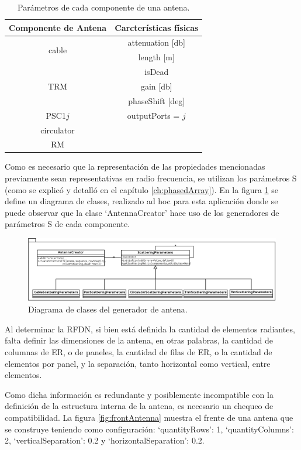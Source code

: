 \begin{table}[H]
  \footnotesize
  \centering
  \begin{tabular}{|c|c|}
	\hline
	\textbf{Componente de Antena} & \textbf{Carcterísticas físicas} \tabularnewline \hline 
	\multirow{2}{*}{cable} &  attenuation [db] \tabularnewline \cline{2-2}
	 & length [m] \tabularnewline \hline 
	\multirow{3}{*}{TRM} & isDead \tabularnewline \cline{2-2}
	 & gain [db]\tabularnewline \cline{2-2}
	 & phaseShift [deg] \tabularnewline \hline 
	PSC1$j$ & outputPorts = $j$ \tabularnewline \hline 
	circulator & \tabularnewline \hline 
	RM & \tabularnewline \hline 
  \end{tabular}
  \caption{Parámetros de cada componente de una antena.}
  \label{tab:propertiesOfComponents}
\end{table}

Como es necesario que la representación de las propiedades mencionadas previamente sean representativas en radio frecuencia,
se utilizan los parámetros S (como se explicó y detalló en el capítulo \ref{ch:phasedArray}). En la figura \ref{fig:creationPackage} 
se define un diagrama de clases, realizado ad hoc para esta aplicación donde se puede observar que la clase \enquote*{AntennaCreator}
hace uso de los generadores de parámetros S de cada componente.

\begin{figure}
 \centering
 \includegraphics[width=15cm]{gfx/creationPackage.png}
 \caption{Diagrama de clases del generador de antena.}
 \label{fig:creationPackage}
\end{figure}

Al determinar la RFDN, si bien está definida la cantidad de elementos radiantes, falta definir las dimensiones de la antena, 
en otras palabras, la cantidad de columnas de ER, o de paneles, la cantidad de filas de ER, o la cantidad de elementos por
panel, y la separación, tanto horizontal como vertical, entre elementos. 

Como dicha información es redundante y posiblemente incompatible con la definición de la estructura interna de la antena, es 
necesario un chequeo de compatibilidad. La figura \ref{fig:frontAntenna} muestra el frente de una antena que se construye 
teniendo como configuración: \enquote*{quantityRows}: 1, \enquote*{quantityColumns}: 2, \enquote*{verticalSeparation}: 0.2 y
\enquote*{horizontalSeparation}: 0.2.


